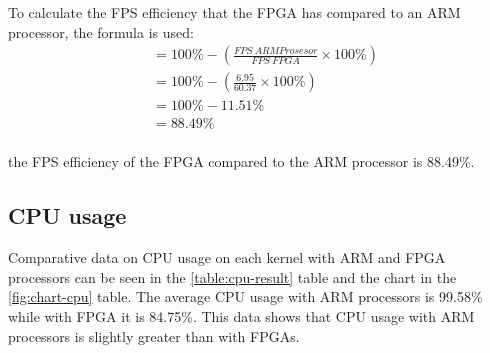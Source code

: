 
To calculate the FPS efficiency that the FPGA has compared to an ARM processor, the formula is used:
\begin{equation*}
    \begin{split}
& = 100\% - \left( \frac{FPS\ ARM Prosesor}{FPS\ FPGA} \times 100\% \right) \\
& = 100\% - \left( \frac{6.95}{60.37} \times 100\% \right) \\
& = 100\% - 11.51\% \\
& = 88.49\% \\
    \end{split}
\end{equation*}


the FPS efficiency of the FPGA compared to the ARM processor is 88.49\%.

\subsection{CPU usage}


Comparative data on CPU usage on each kernel with ARM and FPGA processors can be seen in the \ref{table:cpu-result} table and the chart in the \ref{fig:chart-cpu} table. The average CPU usage with ARM processors is 99.58\% while with FPGA it is 84.75\%. This data shows that CPU usage with ARM processors is slightly greater than with FPGAs.

